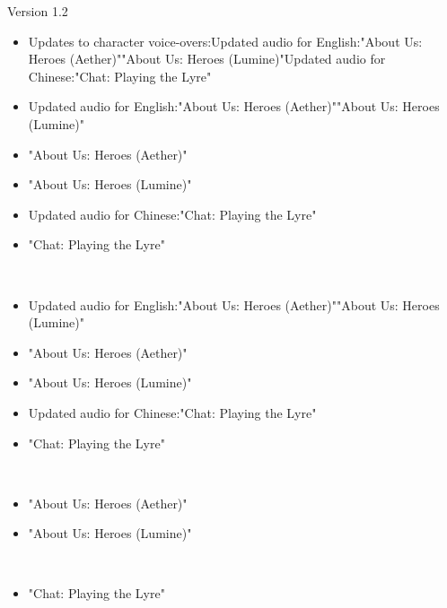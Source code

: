 \documentclass[a4paper,12pt]{article}
\begin{document}
Version 1.2\\ \par \vspace{0.5cm}

\begin{itemize}
\item Updates to character voice-overs:Updated audio for English:"About Us: Heroes (Aether)""About Us: Heroes (Lumine)"Updated audio for Chinese:"Chat: Playing the Lyre"
\item Updated audio for English:"About Us: Heroes (Aether)""About Us: Heroes (Lumine)"
\item "About Us: Heroes (Aether)"
\item "About Us: Heroes (Lumine)"
\item Updated audio for Chinese:"Chat: Playing the Lyre"
\item "Chat: Playing the Lyre"
\end{itemize}\\ \par \vspace{0.5cm}

\begin{itemize}
\item Updated audio for English:"About Us: Heroes (Aether)""About Us: Heroes (Lumine)"
\item "About Us: Heroes (Aether)"
\item "About Us: Heroes (Lumine)"
\item Updated audio for Chinese:"Chat: Playing the Lyre"
\item "Chat: Playing the Lyre"
\end{itemize}\\ \par \vspace{0.5cm}

\begin{itemize}
\item "About Us: Heroes (Aether)"
\item "About Us: Heroes (Lumine)"
\end{itemize}\\ \par \vspace{0.5cm}

\begin{itemize}
\item "Chat: Playing the Lyre"
\end{itemize}\\ \par \vspace{0.5cm}
\end{document}
